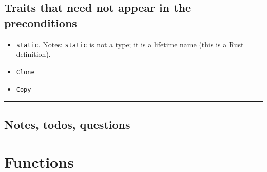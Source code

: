 \documentclass[11pt,a4paper]{article}
\theoremstyle{definition}
\newcommand{\horizline}{\noindent\rule{\textwidth}{1pt}}
\begin{document}
\subsection{Traits that need not appear in the preconditions}
\begin{itemize}
    \item \texttt{\textquotesingle static}. Notes: \texttt{\textquotesingle static} is not a type; it is a lifetime name (this is a Rust definition).
    \item \texttt{Clone}
    \item \texttt{Copy}
\end{itemize}
\horizline
\subsection{Notes, todos, questions}
\section{Functions}
\end{document}
